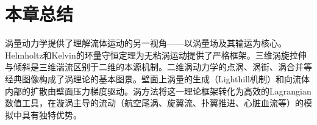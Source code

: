 \section{本章总结}

涡量动力学提供了理解流体运动的另一视角——以涡量场及其输运为核心。Helmholtz和Kelvin的环量守恒定理为无粘涡运动提供了严格框架。三维涡旋拉伸与倾斜是三维湍流区别于二维的本源机制。二维涡动力学的点涡、涡街、涡合并等经典图像构成了涡理论的基本图景。壁面上涡量的生成（Lighthill机制）和向流体内部的扩散由壁面压力梯度驱动。涡方法将这一理论框架转化为高效的Lagrangian数值工具，在漩涡主导的流动（航空尾涡、旋翼流、扑翼推进、心脏血流等）的模拟中具有独特优势。
